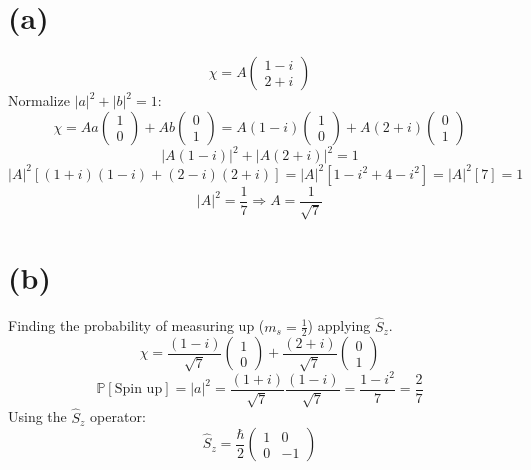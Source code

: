 \documentclass[11pt]{article}
\def\mbb{\mathbb}
\def\P{\mbb{P}}
\def\h{\hbar}
\newcommand{\Matrix}[1]{\begin{pmatrix} #1 \end{pmatrix}}
\renewcommand{\hat}{\widehat}
\theoremstyle{pink}
\theoremstyle{boxedsolution}
\theoremstyle{definition}
\theoremstyle{claim}
\begin{document}
\section*{(a)}
\[\chi=A
\Matrix{ 1-i \\
2+i}\]
Normalize $|a|^2+|b|^2=1$:
\[\chi=Aa\Matrix{1\\0}+Ab\Matrix{0\\1}=A(1-i)\Matrix{1\\0}+A(2+i)\Matrix{0\\1}\]
\vspace{3mm}
\[|A(1-i)|^2+|A(2+i)|^2=1\]
\vspace{3mm}
\[|A|^2\left[(1+i)(1-i)+(2-i)(2+i)\right]=|A|^2\left[1-i^2+4-i^2\right]=|A|^2\left[7\right]=1\]
\vspace{3mm}
\[|A|^2=\frac{1}{7} \Rightarrow A=\frac{1}{\sqrt{7}}\]

\section*{(b)}
Finding the probability of measuring up ($m_s=\frac{1}{2}$) applying $\hat{S}_z$.
\[\chi=\frac{(1-i)}{\sqrt{7}}\Matrix{1\\ 0}+\frac{(2+i)}{\sqrt{7}}\Matrix{0\\ 1}\]
\vspace{3mm}
\[\P\left[\text{Spin up}\right]=|a|^2=\frac{(1+i)}{\sqrt{7}}\frac{(1-i)}{\sqrt{7}}=\frac{1-i^2}{7}=\frac{2}{7}\]
Using the $\hat{S}_z$ operator:
\[\hat{S}_z=\frac{\h}{2}\Matrix{1 & 0\\ 0 & -1}\]
\vspace{3mm}
\end{document}
